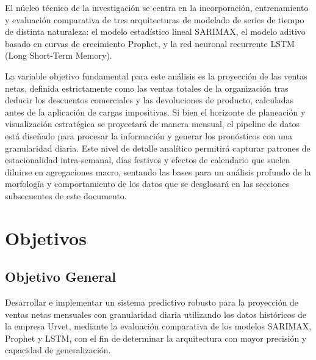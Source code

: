 \documentclass[11pt,a4paper]{report}
\begin{document}
El núcleo técnico de la investigación se centra en la incorporación, entrenamiento y evaluación comparativa de tres arquitecturas
de modelado de series de tiempo de distinta naturaleza: el modelo estadístico lineal SARIMAX, el modelo aditivo basado en curvas de crecimiento Prophet,
y la red neuronal recurrente LSTM (Long Short-Term Memory).

La variable objetivo fundamental para este análisis es la proyección de las ventas netas, definida estrictamente como las ventas totales de la
organización tras deducir los descuentos comerciales y las devoluciones de producto, calculadas antes de la aplicación de cargas impositivas.
Si bien el horizonte de planeación y visualización estratégica se proyectará de manera mensual, el pipeline de datos está diseñado para procesar
la información y generar los pronósticos con una granularidad diaria. Este nivel de detalle analítico permitirá capturar patrones de estacionalidad intra-semanal,
días festivos y efectos de calendario que suelen diluirse en agregaciones macro, sentando las bases para un análisis profundo de la morfología y comportamiento
de los datos que se desglosará en las secciones subsecuentes de este documento.

\section{Objetivos}

\subsection{Objetivo General}
Desarrollar e implementar un sistema predictivo robusto para la proyección de ventas netas mensuales con granularidad diaria utilizando
los datos históricos de la empresa Urvet, mediante la evaluación comparativa de los modelos SARIMAX, Prophet y LSTM, con el fin de
determinar la arquitectura con mayor precisión y capacidad de generalización.
\end{document}
